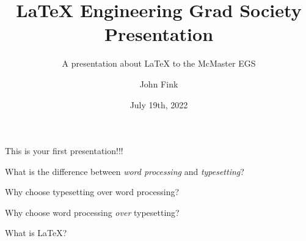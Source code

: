 \documentclass{beamer}
\title{\LaTeX{} Engineering Grad Society Presentation}
\subtitle{A presentation about \LaTeX{} to the McMaster EGS}
\author{John Fink}
\institute{McMaster University}
\date{July 19th, 2022}
\begin{document}
	\begin{frame}
		\titlepage
	\end{frame}
	\begin{frame}
		This is your first presentation!!!
	\end{frame}
\begin{frame}
	What is the difference between \textit{word processing} and \textit{typesetting}?
\end{frame}

\begin{frame}
	Why choose typesetting over word processing?
\end{frame}

\begin{frame}
\end{frame}

\begin{frame}
	Why choose word processing \textit{over} typesetting?
\end{frame}

\begin{frame}
	What is \LaTeX{}?
\end{frame}

\begin{frame}
	
\end{frame}
	
\end{document}
